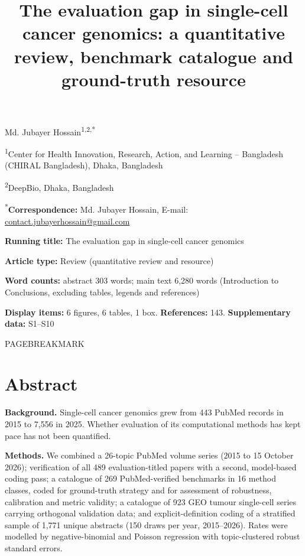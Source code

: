 \documentclass{article}
\title{The evaluation gap in single-cell cancer genomics: a quantitative review, benchmark catalogue and ground-truth resource}
\date{}
\begin{document}
\maketitle
\noindent Md. Jubayer Hossain\textsuperscript{1,2,*}

\noindent \textsuperscript{1}Center for Health Innovation, Research, Action, and Learning -- Bangladesh (CHIRAL Bangladesh), Dhaka, Bangladesh

\noindent \textsuperscript{2}DeepBio, Dhaka, Bangladesh

\noindent \textsuperscript{*}\textbf{Correspondence:} Md. Jubayer Hossain, E-mail: \href{mailto:contact.jubayerhossain@gmail.com}{contact.jubayerhossain@gmail.com}

\noindent \textbf{Running title:} The evaluation gap in single-cell cancer genomics

\noindent \textbf{Article type:} Review (quantitative review and resource)

\noindent \textbf{Word counts:} abstract 303 words; main text 6,280 words (Introduction to Conclusions, excluding tables, legends and references)

\noindent \textbf{Display items:} 6 figures, 6 tables, 1 box. \textbf{References:} 143. \textbf{Supplementary data:} S1--S10

PAGEBREAKMARK





\section{Abstract}\label{abstract}
\begingroup\setlength{\parindent}{0pt}\setlength{\parskip}{0.6ex}

\textbf{Background.} Single-cell cancer genomics grew from 443 PubMed
records in 2015 to 7,556 in 2025. Whether evaluation of its
computational methods has kept pace has not been quantified.

\textbf{Methods.} We combined a 26-topic PubMed volume series (2015 to
15 October 2026); verification of all 489 evaluation-titled papers with
a second, model-based coding pass; a catalogue of 269 PubMed-verified
benchmarks in 16 method classes, coded for ground-truth strategy and for
assessment of robustness, calibration and metric validity; a catalogue
of 923 GEO tumour single-cell series carrying orthogonal validation
data; and explicit-definition coding of a stratified sample of 1,771
unique abstracts (150 draws per year, 2015--2026). Rates were modelled
by negative-binomial and Poisson regression with topic-clustered robust
standard errors.
\end{document}
